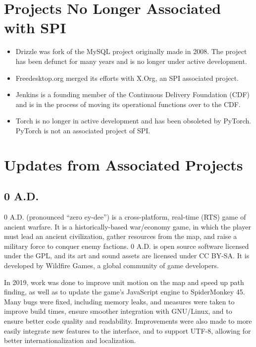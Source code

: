 \documentclass[a4paper]{report}
\begin{document}
\section{Projects No Longer Associated with SPI}

\begin{itemize}

\item Drizzle was fork of the MySQL project originally made in 2008.
The project has been defunct for many years and is no longer under
active development.

\item Freedesktop.org merged its efforts with X.Org, an SPI associated
project.

\item Jenkins is a founding member of the Continuous Delivery Foundation
(CDF) and is in the process of moving its operational functions over to
the CDF.

\item Torch is no longer in active development and has been obsoleted
by PyTorch.  PyTorch is not an associated project of SPI.

\end{itemize}

\section{Updates from Associated Projects}

\subsection{0 A.D.}

0 A.D. (pronounced ``zero ey-dee'') is a cross-platform, real-time (RTS)
game of ancient warfare. It is a historically-based war/economy game, in
which the player must lead an ancient civilization, gather resources
from the map, and raise a military force to conquer enemy factions. 0
A.D.  is open source software licensed under the GPL, and its art and
sound assets are licensed under CC BY-SA. It is developed by Wildfire
Games, a global community of game developers.

In 2019, work was done to improve unit motion on the map and speed up
path finding, as well as to update the game's JavaScript engine to
SpiderMonkey 45.  Many bugs were fixed, including memory leaks, and
measures were taken to improve build times, ensure smoother integration
with GNU/Linux, and to ensure better code quality and readability.
Improvements were also made to more easily integrate new features to the
interface, and to support UTF-8, allowing for better
internationalization and localization.
\end{document}
